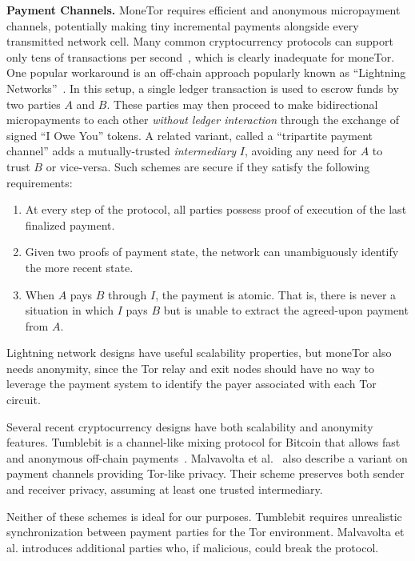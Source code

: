 \medskip \noindent\textbf{Payment Channels.}  
MoneTor requires efficient and anonymous micropayment channels, potentially making tiny incremental payments alongside every transmitted network cell. Many common cryptocurrency protocols can support only tens of transactions per second~\cite{team2018blockchain}, which is clearly inadequate for moneTor.  One popular workaround is an off-chain approach popularly known as ``Lightning Networks''~\cite{poon2016bitcoin}.  In this setup, a single ledger transaction is used to escrow funds by two parties $A$ and $B$.  These parties may then proceed to make bidirectional micropayments to each other \emph{without ledger interaction} through the exchange of signed ``I Owe You'' tokens. A related variant, called a ``tripartite payment channel'' adds a mutually-trusted {\em intermediary} $I$, avoiding any need for $A$ to trust $B$ or vice-versa. Such schemes are secure if they satisfy the following requirements:

\begin{enumerate}
\item At every step of the protocol, all parties possess proof of execution of the last finalized payment.
\item Given two proofs of payment state, the network can unambiguously identify the more recent state.
\item When $A$ pays $B$ through $I$, the payment is atomic.
      That is, there is never a situation in which $I$ pays $B$ but is unable to extract the agreed-upon payment from $A$.
\end{enumerate}

Lightning network designs have useful scalability properties, but moneTor also needs anonymity, since the Tor relay and exit nodes should have no way to leverage the payment system to identify the payer associated with each Tor circuit. 

Several recent cryptocurrency designs have both scalability and anonymity features. Tumblebit is a channel-like mixing protocol for Bitcoin that allows fast and anonymous off-chain payments~\cite{heilman2017tumblebit}.  Malvavolta et al.~\cite{malavolta2017concurrency} also describe a variant on payment channels providing Tor-like privacy. Their scheme preserves both sender and receiver privacy, assuming at least one trusted intermediary.  

Neither of these schemes is ideal for our purposes. Tumblebit requires unrealistic synchronization between payment parties for the Tor environment. Malvavolta et al. introduces additional parties who, if malicious, could break the protocol.

